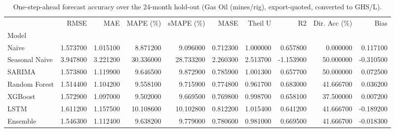 \begin{table}
\caption{One-step-ahead forecast accuracy over the 24-month hold-out (Gas Oil (mines/rig), export-quoted, converted to GHS/L).}
\label{tab:headline}
\begin{tabular}{lrrrrrrrrr}
\toprule
 & RMSE & MAE & MAPE (\%) & sMAPE (\%) & MASE & Theil U & R2 & Dir. Acc (\%) & Bias \\
Model &  &  &  &  &  &  &  &  &  \\
\midrule
Naive & 1.573700 & 1.015100 & 8.871200 & 9.096000 & 0.712300 & 1.000000 & 0.657800 & 0.000000 & 0.117100 \\
Seasonal Naive & 3.947800 & 3.221200 & 30.336000 & 28.733200 & 2.260300 & 2.513700 & -1.153900 & 50.000000 & -0.310500 \\
SARIMA & 1.573800 & 1.119900 & 9.646500 & 9.872900 & 0.785900 & 1.001300 & 0.657700 & 50.000000 & 0.072500 \\
Random Forest & 1.514400 & 1.104200 & 9.558100 & 9.715900 & 0.774800 & 0.961700 & 0.683000 & 41.666700 & 0.036200 \\
XGBoost & 1.572900 & 1.097000 & 9.502000 & 9.669500 & 0.769800 & 0.998700 & 0.658100 & 37.500000 & 0.007200 \\
LSTM & 1.611200 & 1.157500 & 10.108600 & 10.102800 & 0.812200 & 1.015400 & 0.641200 & 41.666700 & -0.189200 \\
Ensemble & 1.546300 & 1.112400 & 9.638200 & 9.779000 & 0.780600 & 0.981000 & 0.669500 & 41.666700 & -0.018300 \\
\bottomrule
\end{tabular}
\end{table}
